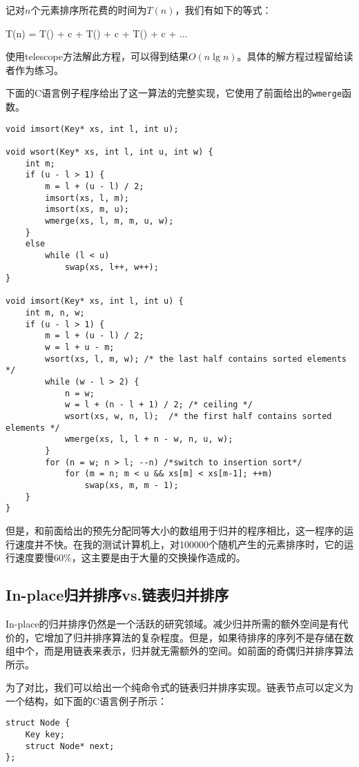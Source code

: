 \documentclass[UTF8]{article}
\begin{document}
记对$n$个元素排序所花费的时间为$T(n)$，我们有如下的等式：

\be
T(n) = T() + c  + T() + c  + T() + c  + ...
\ee

使用telescope方法解此方程，可以得到结果$O(n \lg n)$。具体的解方程过程留给读者作为练习。

下面的C语言例子程序给出了这一算法的完整实现，它使用了前面给出的\texttt{wmerge}函数。

\lstset{language=C}
\begin{lstlisting}
void imsort(Key* xs, int l, int u);

void wsort(Key* xs, int l, int u, int w) {
    int m;
    if (u - l > 1) {
        m = l + (u - l) / 2;
        imsort(xs, l, m);
        imsort(xs, m, u);
        wmerge(xs, l, m, m, u, w);
    }
    else
        while (l < u)
            swap(xs, l++, w++);
}

void imsort(Key* xs, int l, int u) {
    int m, n, w;
    if (u - l > 1) {
        m = l + (u - l) / 2;
        w = l + u - m;
        wsort(xs, l, m, w); /* the last half contains sorted elements */
        while (w - l > 2) {
            n = w;
            w = l + (n - l + 1) / 2; /* ceiling */
            wsort(xs, w, n, l);  /* the first half contains sorted elements */
            wmerge(xs, l, l + n - w, n, u, w);
        }
        for (n = w; n > l; --n) /*switch to insertion sort*/
            for (m = n; m < u && xs[m] < xs[m-1]; ++m)
                swap(xs, m, m - 1);
    }
}
\end{lstlisting}

但是，和前面给出的预先分配同等大小的数组用于归并的程序相比，这一程序的运行速度并不快。在我的测试计算机上，对100000个随机产生的元素排序时，它的运行速度要慢60\%，这主要是由于大量的交换操作造成的。

\subsection{In-place归并排序vs.链表归并排序}

In-place的归并排序仍然是一个活跃的研究领域。减少归并所需的额外空间是有代价的，它增加了归并排序算法的复杂程度。但是，如果待排序的序列不是存储在数组中个，而是用链表来表示，归并就无需额外的空间。如前面的奇偶归并排序算法所示。

为了对比，我们可以给出一个纯命令式的链表归并排序实现。链表节点可以定义为一个结构，如下面的C语言例子所示：

\lstset{language=C}
\begin{lstlisting}
struct Node {
    Key key;
    struct Node* next;
};
\end{lstlisting}
\end{document}
